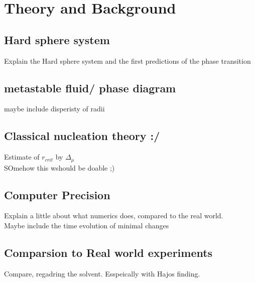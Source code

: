 
\section{Theory and Background}
\label{sec:theory}

\subsection{Hard sphere system}
Explain the Hard sphere system and the first predictions of the phase transition

\subsection{metastable fluid/ phase diagram}
maybe include disperisty of radii

\subsection{Classical nucleation theory :/}
Estimate of $r_{crit}$ by $\Delta_{\mu}$\\
SOmehow this wshould be doable ;)

\subsection{Computer Precision}
Explain a little about what numerics does, compared to the real world.\\
Maybe include the time evolution of minimal changes

\subsection{Comparsion to Real world experiments} 
Compare, regadring the solvent. Esspeically with Hajos finding.
